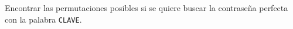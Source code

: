 Encontrar las permutaciones posibles si se quiere buscar la contraseña perfecta con la palabra \texttt{CLAVE}.

